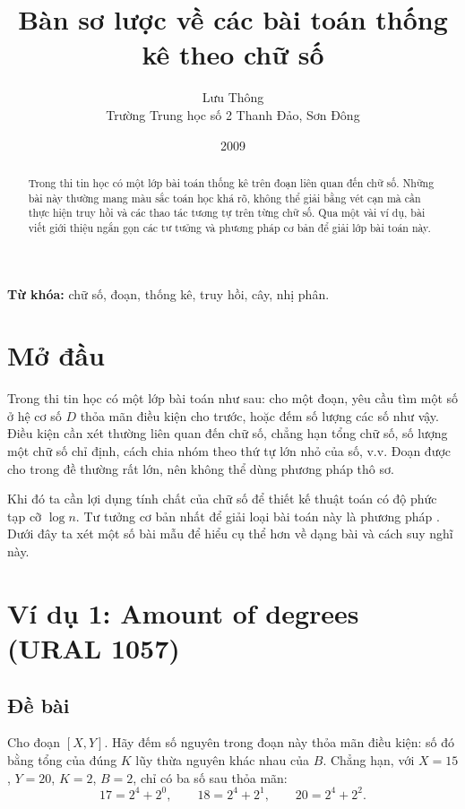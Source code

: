 \documentclass[11pt]{article}
\title{Bàn sơ lược về các bài toán thống kê theo chữ số}
\author{Lưu Thông\\Trường Trung học số 2 Thanh Đảo, Sơn Đông}
\date{2009}
\begin{document}
\maketitle


\begin{abstract}
Trong thi tin học có một lớp bài toán thống kê trên đoạn liên quan đến chữ số.
Những bài này thường mang màu sắc toán học khá rõ, không thể giải bằng vét cạn
mà cần thực hiện truy hồi và các thao tác tương tự trên từng chữ số. Qua một
vài ví dụ, bài viết giới thiệu ngắn gọn các tư tưởng và phương pháp cơ bản để
giải lớp bài toán này.
\end{abstract}

\noindent\textbf{Từ khóa:} chữ số, đoạn, thống kê, truy hồi, cây, nhị phân.

\section{Mở đầu}

Trong thi tin học có một lớp bài toán như sau: cho một đoạn, yêu cầu tìm một
số ở hệ cơ số $D$ thỏa mãn điều kiện cho trước, hoặc đếm số lượng các số như
vậy. Điều kiện cần xét thường liên quan đến chữ số, chẳng hạn tổng chữ số, số
lượng một chữ số chỉ định, cách chia nhóm theo thứ tự lớn nhỏ của số, v.v. Đoạn
được cho trong đề thường rất lớn, nên không thể dùng phương pháp thô sơ.

Khi đó ta cần lợi dụng tính chất của chữ số để thiết kế thuật toán có độ phức
tạp cỡ $\log n$. Tư tưởng cơ bản nhất để giải loại bài toán này là phương pháp
. Dưới đây ta xét một số bài mẫu để hiểu cụ thể hơn
về dạng bài và cách suy nghĩ này.

\section{Ví dụ 1: Amount of degrees (URAL 1057)}

\subsection{Đề bài}

Cho đoạn $[X,Y]$. Hãy đếm số nguyên trong đoạn này thỏa mãn điều kiện: số đó
bằng tổng của đúng $K$ lũy thừa nguyên khác nhau của $B$. Chẳng hạn, với
$X=15$, $Y=20$, $K=2$, $B=2$, chỉ có ba số sau thỏa mãn:
\[
  17=2^4+2^0,\qquad
  18=2^4+2^1,\qquad
  20=2^4+2^2.
\]
\end{document}
